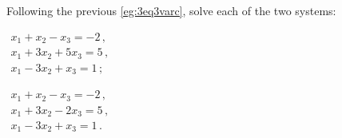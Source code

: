 \begin{example} \label{eg:3eq3vard}
Following the previous \cref{eg:3eq3varc}, solve each of the two systems:
\begin{Parts}
\item \(\begin{array}{l}
x_1+x_2-x_3=-2\,,\\
x_1+3x_2+5x_3=5\,,\\
x_1-3x_2+x_3=1\,;
\end{array}\)
\item \(\begin{array}{l}
x_1+x_2-x_3=-2\,,\\
x_1+3x_2-2x_3=5\,,\\
x_1-3x_2+x_3=1\,.
\end{array}\)
\end{Parts}


\end{example}
